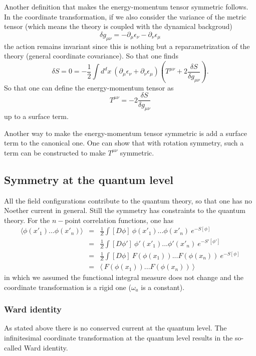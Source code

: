 \documentclass[submission, PhysLectNotes]{SciPost}
\begin{document}
Another definition that makes the energy-momentum tensor symmetric follows. In the coordinate transformation, if we also consider the variance of the metric tensor (which means the theory is coupled with the dynamical backgroud)
\begin{equation}
\delta g_{\mu\nu} = -\partial_\mu\epsilon_\nu -\partial_\nu\epsilon_\mu
\end{equation}
the action remains invariant since this is nothing but a reparametrization of the theory (general coordinate covariance). So that one finds
\begin{equation}
    \delta S = 0 = -\frac{1}{2} \int d^dx \ \left(\partial_\mu\epsilon_\nu + \partial_\nu\epsilon_\mu\right) \left(T^{\mu\nu} +2\frac{\delta S}{\delta g_{\mu\nu}}\right).
\end{equation}
So that one can define the energy-momentum tensor as
\begin{equation}
    T^{\mu\nu} = -2\frac{\delta S}{\delta g_{\mu\nu}}
\end{equation}
up to a surface term.

Another way to make the energy-momentum tensor symmetric is add a surface term to the canonical one. One can show that with rotation symmetry, such a term can be constructed to make $T^{\mu\nu}$ symmetric.

\subsection{Symmetry at the quantum level}
All the field configurations contribute to the quantum theory, so that one has no Noether current in general. Still the symmetry has constraints to the quantum theory. For the $n-$point correlation functions, one has
\begin{eqnarray}
\langle \phi(x'_1)...\phi(x'_n) \rangle &=& \frac{1}{Z}\int [D\phi]\ \phi(x'_1)...\phi(x'_n) \ e^{-S[\phi]} \\
&=& \frac{1}{Z}\int [D\phi']\ \phi'(x'_1)...\phi'(x'_n) \ e^{-S'[\phi']} \\
&=& \frac{1}{Z}\int [D\phi]\ F(\phi(x_1))...F(\phi(x_n)) \ e^{-S[\phi]} \\
&=& \langle\ F(\phi(x_1))...F(\phi(x_n)) \ \rangle
\end{eqnarray}
in which we assumed the functional integral measure does not change and the coordinate transformation is a rigid one ($\omega_a$ is a constant).
\subsubsection{Ward identity}
As stated above there is no conserved current at the quantum level. The infinitesimal coordinate transformation at the quantum level results in the so-called Ward identity.
\end{document}
